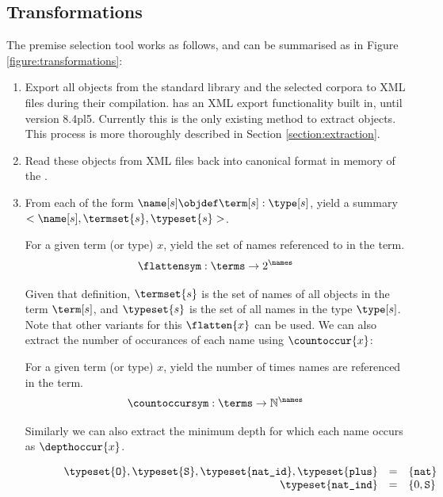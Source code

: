 \subsection{Transformations}
\label{section:transformations}
The premise selection tool works as follows, and can be summarised as in Figure \ref{figure:transformations}:
\begin{enumerate}
    \item Export all \coq objects from the standard library and the selected corpora to XML files during their compilation.
		\coq has an XML export functionality built in, until version 8.4pl5.
		Currently this is the only existing method to extract \coq objects.
		This process is more thoroughly described in Section \ref{section:extraction}.
	\item Read these objects from XML files back into canonical \acic{} format in memory of the \preloader.
	\item From each \coqobj[s] of the form $\name[s] \objdef \term[s] : \type[s]$,
		yield a summary $<\name[s], \termset{s}, \typeset{s}>$.
		\begin{definition}[$\flatten{x}$]
			For a given term (or type) $x$, yield the set of names referenced to in the term.
			\[ \flattensym : \terms \rightarrow 2^{\names} \]
		\end{definition}
		Given that definition, $\termset{s}$ is the set of names of all objects in the term $\term[s]$,
		and $\typeset{s}$ is the set of all names in the type $\type[s]$.
		Note that other variants for this $\flatten{x}$ can be used.
    We can also extract the number of occurances of each name using $\countoccur{x}$:
    \begin{definition}[$\countoccur{x}$]
			For a given term (or type) $x$, yield the number of times names are referenced in the term.
      \[ \countoccursym : \terms \rightarrow \mathbb{N}^{\names} \]
    \end{definition}
    Similarly we can also extract the minimum depth for which each name occurs as $\depthoccur{x}$.
		\begin{figure}[H]
			\[
				\begin{array}{rcl}
					\typeset{\texttt{O}}, \typeset{\texttt{S}}, \typeset{\texttt{nat\_id}}, \typeset{\texttt{plus}} & = & \{ \texttt{nat} \}\\
					\typeset{\texttt{nat\_ind}} & = & \{ 0, \texttt{S} \} \\

\end{array}\]
\end{figure}
\end{enumerate}
